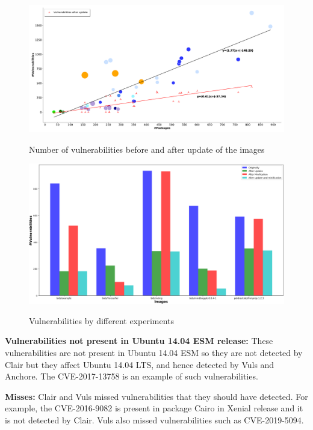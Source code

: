 \documentclass[a4paper,num-refs]{oup-contemporary}
\begin{document}
\begin{figure}[!ht]
        {\includegraphics[width=\textwidth]
        {Figures/vulnwithupdate.pdf}}
	\vspace*{-7mm}
        \caption{\label{fig:graph2} Number of vulnerabilities before and
        after update of the images}
      \end{figure}


\begin{figure}[!ht]
        {\includegraphics[scale=1.5,width=\textwidth]
        {Figures/bargraph.png}}
	\vspace*{-5mm}
        \caption{\label{fig:bargraph} Vulnerabilities by different experiments}
      \end{figure}
\textbf{Vulnerabilities not present in Ubuntu 14.04 ESM release:} These vulnerabilities are not present in Ubuntu 14.04 ESM so they 
are not detected by Clair but they affect Ubuntu 14.04 LTS, and hence detected by Vuls and Anchore. The CVE-2017-13758 is an example
of such vulnerabilities.

\textbf{Misses:} Clair and Vuls
missed vulnerabilities that they should have detected. For example, the CVE-2016-9082 
is present in package Cairo in Xenial release and it is not detected by Clair.
Vuls also missed vulnerabilities such as CVE-2019-5094.
\end{document}
